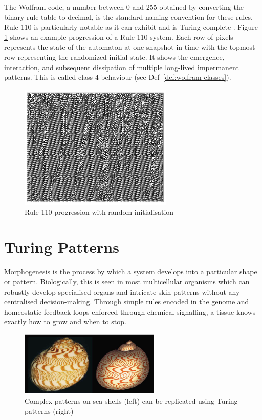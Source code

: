 The Wolfram code, a number between 0 and 255 obtained by converting the binary rule table to decimal, is the standard naming convention for these rules. Rule 110 is particularly notable as it can exhibit  and is Turing complete \cite{cook2004universality}. Figure \ref{fig:rule-110} shows an example progression of a Rule 110 system. Each row of pixels represents the state of the automaton at one snapshot in time with the topmost row representing the randomized initial state. It shows the emergence, interaction, and subsequent dissipation of multiple long-lived impermanent patterns. This is called class 4 behaviour\cite{wolfram2002} (see Def~\ref{def:wolfram-classes}).

\begin{figure}[!h]
\centering
\includegraphics[width=0.65\textwidth]{images/rule-110.png}
\caption{Rule 110 progression with random initialisation \cite{wolfram2002}}
\label{fig:rule-110}
\end{figure}

\section{Turing Patterns}
Morphogenesis is the process by which a system develops into a particular shape or pattern.  Biologically, this is seen in most multicellular organisms which can robustly develop specialised organs and intricate skin patterns without any centralised decision-making. Through simple rules encoded in the genome and homeostatic feedback loops enforced through chemical signalling, a tissue knows exactly how to grow and when to stop.

\begin{figure}[H]
\centering
\includegraphics[width=0.6\textwidth]{images/turing-shell.png}
\caption{Complex patterns on sea shells (left) can be replicated using Turing patterns (right) \cite{meinhardt2009algorithmic}}
\label{fig:seashells}
\end{figure}

